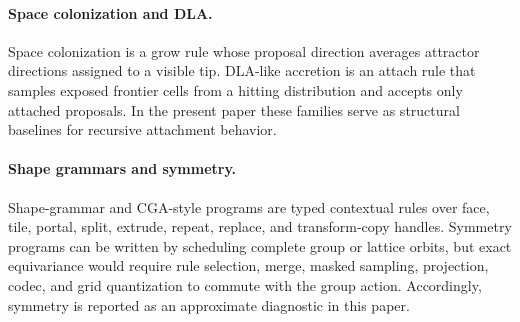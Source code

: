 \documentclass[acmtog,anonymous,review]{acmart}
\begin{document}
\paragraph{Space colonization and DLA.}
Space colonization is a grow rule whose proposal direction averages attractor directions assigned to a visible tip. DLA-like accretion is an attach rule that samples exposed frontier cells from a hitting distribution and accepts only attached proposals. In the present paper these families serve as structural baselines for recursive attachment behavior.

\paragraph{Shape grammars and symmetry.}
Shape-grammar and CGA-style programs are typed contextual rules over face, tile, portal, split, extrude, repeat, replace, and transform-copy handles. Symmetry programs can be written by scheduling complete group or lattice orbits, but exact equivariance would require rule selection, merge, masked sampling, projection, codec, and grid quantization to commute with the group action. Accordingly, symmetry is reported as an approximate diagnostic in this paper.
\end{document}
